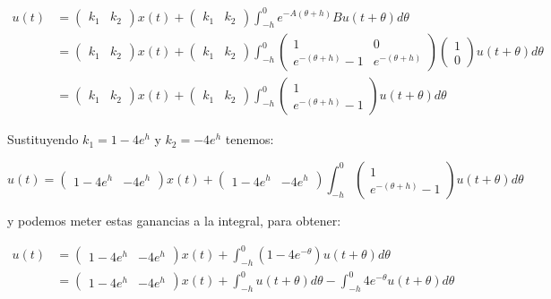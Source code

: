 \documentclass{article}
\begin{document}
\[
\begin{align}
u(t) &=
\begin{pmatrix}
k_1 & k_2
\end{pmatrix} x(t) +
\begin{pmatrix}
k_1 & k_2
\end{pmatrix}
\int_{-h}^0 e^{-A(\theta + h)} B u(t + \theta) d\theta \\
&=
\begin{pmatrix}
k_1 & k_2
\end{pmatrix} x(t) +
\begin{pmatrix}
k_1 & k_2
\end{pmatrix}
\int_{-h}^0
\begin{pmatrix}
1 & 0 \\
e^{-(\theta + h)} - 1 & e^{-(\theta + h)}
\end{pmatrix}
\begin{pmatrix}
1 \\
0
\end{pmatrix}
u(t + \theta) d\theta \\
&=
\begin{pmatrix}
k_1 & k_2
\end{pmatrix} x(t) +
\begin{pmatrix}
k_1 & k_2
\end{pmatrix}
\int_{-h}^0
\begin{pmatrix}
1 \\
e^{-(\theta + h)} - 1
\end{pmatrix}
u(t + \theta) d\theta
\end{align}
\]

Sustituyendo \(k_1 = 1 - 4 e^h\) y \(k_2 = -4e^h\) tenemos:

\[
u(t)=
\begin{pmatrix}
1 - 4 e^h & -4e^h
\end{pmatrix} x(t) +
\begin{pmatrix}
1 - 4 e^h & -4e^h
\end{pmatrix}
\int_{-h}^0
\begin{pmatrix}
1 \\
e^{-(\theta + h)} - 1
\end{pmatrix}
u(t + \theta) d\theta
\]

y podemos meter estas ganancias a la integral, para obtener:

\[
\begin{align}
u(t) &=
\begin{pmatrix}
1 - 4 e^h & -4e^h
\end{pmatrix} x(t) +
\int_{-h}^0
\left( 1 - 4e^{-\theta} \right)
u(t + \theta) d\theta \\
&=
\begin{pmatrix}
1 - 4 e^h & -4e^h
\end{pmatrix} x(t) +
\int_{-h}^0 u(t + \theta) d\theta -
\int_{-h}^0 4e^{-\theta} u(t + \theta) d\theta
\end{align}
\]
\end{document}

